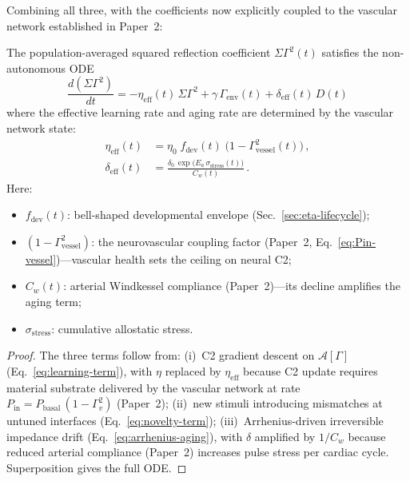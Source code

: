 \documentclass[aps,pre,twocolumn,superscriptaddress,floatfix]{revtex4-2}
\begin{document}
Combining all three, with the coefficients now
explicitly coupled to the vascular network
established in Paper~2:

\begin{theorem}
\label{thm:lifecycle}
The population-averaged squared reflection coefficient
$\Sigma\Gamma^2(t)$ satisfies the non-autonomous ODE
\begin{equation}
  \boxed{\;
  \frac{d(\Sigma\Gamma^2)}{dt}
    = -\eta_{\text{eff}}(t)\,\Sigma\Gamma^2
    + \gamma\,\Gamma_{\mathrm{env}}(t)
    + \delta_{\text{eff}}(t)\,D(t)
  \;}
  \label{eq:lifecycle}
\end{equation}
where the effective learning rate and aging rate
are determined by the vascular network state:
\begin{align}
  \eta_{\text{eff}}(t) &= \eta_0 \;
    f_{\text{dev}}(t) \;
    \bigl(1 - \Gamma^2_{\text{vessel}}(t)\bigr)\,,
    \label{eq:eta-eff} \\[2pt]
  \delta_{\text{eff}}(t) &=
    \frac{\delta_0\,
      \exp\!\bigl(E_a\,\sigma_{\text{stress}}(t)\bigr)}
         {C_w(t)}\,.
    \label{eq:delta-eff}
\end{align}
Here:
\begin{itemize}
  \item $f_{\text{dev}}(t)$: bell-shaped developmental
    envelope (Sec.~\ref{sec:eta-lifecycle});
  \item $(1 - \Gamma^2_{\text{vessel}})$: the
    neurovascular coupling factor
    (Paper~2, Eq.~\ref*{eq:Pin-vessel})---vascular
    health sets the ceiling on neural C2;
  \item $C_w(t)$: arterial Windkessel compliance
    (Paper~2)---its decline amplifies the aging term;
  \item $\sigma_{\text{stress}}$: cumulative allostatic
    stress.
\end{itemize}
\end{theorem}

\begin{proof}
The three terms follow from:
(i)~C2 gradient descent on
$\mathcal{A}[\Gamma]$ (Eq.~\ref{eq:learning-term}),
with $\eta$ replaced by $\eta_{\text{eff}}$ because
C2 update requires material substrate delivered by
the vascular network at rate
$P_{\text{in}} = P_{\text{basal}}\,(1 - \Gamma_v^2)$
(Paper~2);
(ii)~new stimuli introducing mismatches at untuned
interfaces (Eq.~\ref{eq:novelty-term});
(iii)~Arrhenius-driven irreversible impedance drift
(Eq.~\ref{eq:arrhenius-aging}), with $\delta$
amplified by $1/C_w$ because reduced arterial
compliance (Paper~2) increases pulse stress per
cardiac cycle.
Superposition gives the full ODE.
\end{proof}
\end{document}
